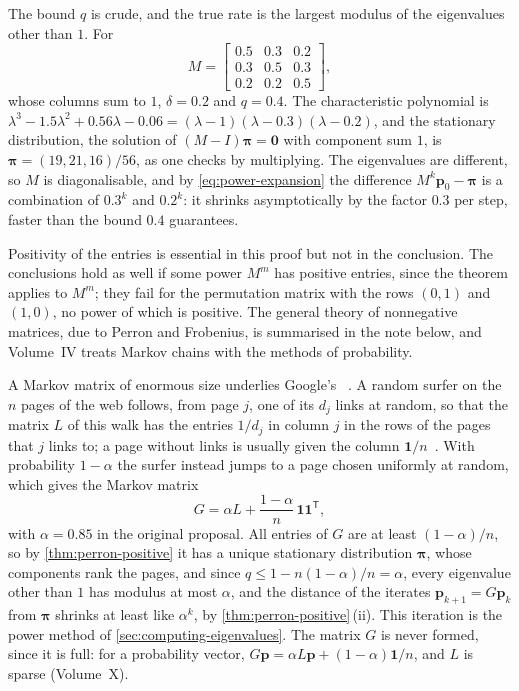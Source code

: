 The bound $q$ is crude, and the true rate is the largest modulus of the eigenvalues other than $1$. For
\[
M=\begin{bmatrix}0.5&0.3&0.2\\0.3&0.5&0.3\\0.2&0.2&0.5\end{bmatrix},
\]
whose columns sum to $1$, $\delta=0.2$ and $q=0.4$. The characteristic polynomial is $\lambda^3-1.5\lambda^2+0.56\lambda-0.06=(\lambda-1)(\lambda-0.3)(\lambda-0.2)$, and the stationary distribution, the solution of $(M-I)\boldsymbol\pi=\mathbf 0$ with component sum $1$, is $\boldsymbol\pi=(19,21,16)/56$, as one checks by multiplying. The eigenvalues are different, so $M$ is diagonalisable, and by \eqref{eq:power-expansion} the difference $M^k\mathbf p_0-\boldsymbol\pi$ is a combination of $0.3^k$ and $0.2^k$: it shrinks asymptotically by the factor $0.3$ per step, faster than the bound $0.4$ guarantees.

Positivity of the entries is essential in this proof but not in the conclusion. The conclusions hold as well if some power $M^m$ has positive entries, since the theorem applies to $M^m$; they fail for the permutation matrix with the rows $(0,1)$ and $(1,0)$, no power of which is positive. The general theory of nonnegative matrices, due to Perron and Frobenius, is summarised in the note below, and Volume~IV treats Markov chains with the methods of probability.

A Markov matrix of enormous size underlies Google's ~\cite{brin1998}. A random surfer on the $n$ pages of the web follows, from page $j$, one of its $d_j$ links at random, so that the matrix $L$ of this walk has the entries $1/d_j$ in column $j$ in the rows of the pages that $j$ links to; a page without links is usually given the column $\mathbf 1/n$~\cite{langville2006}. With probability $1-\alpha$ the surfer instead jumps to a page chosen uniformly at random, which gives the Markov matrix
\[
G=\alpha L+\frac{1-\alpha}n\,\mathbf 1\mathbf 1^{\mathsf T},
\]
with $\alpha=0.85$ in the original proposal. All entries of $G$ are at least $(1-\alpha)/n$, so by \cref{thm:perron-positive} it has a unique stationary distribution $\boldsymbol\pi$, whose components rank the pages, and since $q\le1-n(1-\alpha)/n=\alpha$, every eigenvalue other than $1$ has modulus at most $\alpha$, and the distance of the iterates $\mathbf p_{k+1}=G\mathbf p_k$ from $\boldsymbol\pi$ shrinks at least like $\alpha^k$, by \cref{thm:perron-positive}\,(ii). This iteration is the power method of \cref{sec:computing-eigenvalues}. The matrix $G$ is never formed, since it is full: for a probability vector, $G\mathbf p=\alpha L\mathbf p+(1-\alpha)\mathbf 1/n$, and $L$ is sparse (Volume~X).

